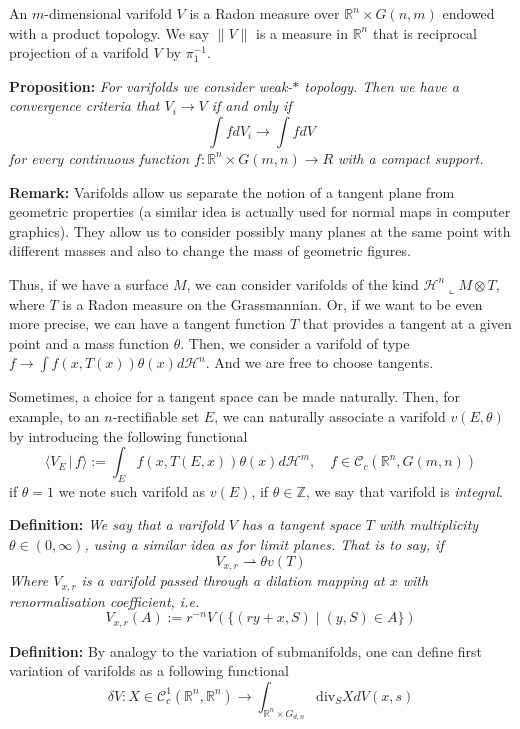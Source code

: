 An $m$-dimensional varifold $V$ is a Radon measure over $\mathbb{R}^n\times
G(n,m)$ endowed with a product topology. We say $\|V\|$ is a measure in
$\mathbb{R}^n$ that is reciprocal projection of a varifold $V$ by $\pi_1^{-1}$.

\vspace{2ex}
\textbf{Proposition:} \textit{For varifolds we consider weak-$*$ topology. Then we have a
convergence criteria that $V_i\rightarrow V$ if and only if
\[\int fdV_i\rightarrow\int fdV\]
for every continuous function $f:\mathbb{R}^n\times G(m,n)\rightarrow R$ with a
compact support.}

\vspace{1ex}
\textbf{Remark:} Varifolds allow us separate the notion of a tangent plane from
geometric properties (a similar idea is actually used for normal maps in computer
graphics). They allow us to consider possibly many planes at the same point with
different masses and also to change the mass of geometric figures.

\vspace{2ex}
Thus, if we have a surface $M$, we can consider varifolds of the kind $\mathcal H^n
\llcorner M\otimes T$, where $T$ is a Radon measure on the Grassmannian. Or, if
we want to be even more precise, we can have a tangent function $T$ that provides
a tangent at a given point and a mass function $\theta$. Then, we consider a
varifold of type $f\rightarrow \int f(x,T(x))\theta(x)d\mathcal H^n$. And we
are free to choose tangents.

\vspace{2ex}
Sometimes, a choice for a tangent space can be made naturally. Then, for
example, to an $n$-rectifiable set $E$, we can naturally associate
a varifold $v(E,\theta)$ by introducing the following functional
\[\langle V_E\,|\, f\rangle:=\int_Ef(x,T(E,x))\theta(x)d\mathcal H^m,\quad f\in\mathcal C_c(\mathbb R^n, G(m,n))\]
if $\theta=1$ we note such varifold as $v(E)$, if $\theta\in\mathbb{Z}$,
we say that varifold is \emph{integral}.

\vspace{2ex}
\textbf{Definition:} \textit{We say that a varifold $V$ has a tangent space $T$
with multiplicity $\theta\in(0,\infty)$, using a similar idea as for limit
planes. That is to say, if}
\[V_{x,r}\rightharpoonup \theta v(T)\]
\textit{Where $V_{x,r}$ is a varifold passed through a dilation mapping at $x$
with renormalisation coefficient, i.e.}
\[V_{x,r}(A):=r^{-n}V(\{(ry+x,S)\;|\;(y,S)\in A\})\]

\vspace{2ex}
\textbf{Definition:} By analogy to the variation of submanifolds, one can define
first variation of varifolds as a following functional
\[\delta V:X\in\mathcal C^1_c(\mathbb R^n,\mathbb R^n)\rightarrow\int_{\mathbb R^n\times G_{d,n}}\text{div}_SXdV(x,s)\]

